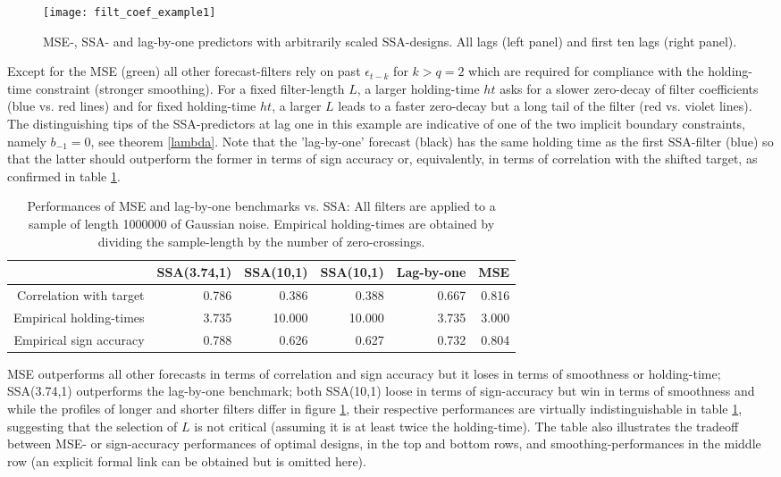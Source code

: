 \documentclass[a4paper]{article}
\begin{document}
\begin{figure}[H]\begin{center}\texttt{[image: filt\_coef\_example1]}\caption{MSE-, SSA- and lag-by-one predictors with arbitrarily scaled SSA-designs. All lags (left panel) and first ten lags (right panel).\label{filt_coef_example1}}\end{center}\end{figure}Except for the MSE (green) all other forecast-filters rely on past $\epsilon_{t-k}$ for $k>q=2$ which are required for compliance with the holding-time constraint (stronger smoothing). For a fixed filter-length $L$, a larger holding-time $ht$ asks for a slower zero-decay of filter coefficients (blue vs. red lines) and for fixed holding-time $ht$, a larger $L$ leads to a faster zero-decay but a long tail of the filter (red vs. violet lines). The distinguishing tips  of the SSA-predictors at lag one in this example are indicative of one of the two implicit boundary constraints, namely $b_{-1}=0$, see theorem \ref{lambda}.  Note that the 'lag-by-one' forecast (black) has the same holding time as the first SSA-filter (blue) so that the latter should outperform the former in terms of sign accuracy or, equivalently, in terms of correlation with the shifted target, as confirmed in table \ref{perf_ex2}.   
\begin{table}[ht]
\centering
\begin{tabular}{rrrrrr}
  \hline
 & SSA(3.74,1) & SSA(10,1) & SSA(10,1) & Lag-by-one & MSE \\ 
  \hline
Correlation with target & 0.786 & 0.386 & 0.388 & 0.667 & 0.816 \\ 
  Empirical holding-times & 3.735 & 10.000 & 10.000 & 3.735 & 3.000 \\ 
  Empirical sign accuracy & 0.788 & 0.626 & 0.627 & 0.732 & 0.804 \\ 
   \hline
\end{tabular}
\caption{Performances of MSE and lag-by-one  benchmarks vs. SSA: All filters are applied to a sample of length 1000000 of Gaussian noise. Empirical holding-times are obtained by dividing the sample-length by the number of zero-crossings.  } 
\label{perf_ex2}
\end{table}MSE outperforms all other forecasts in terms of correlation and sign accuracy  but it loses in terms of  smoothness or holding-time; SSA(3.74,1) outperforms the lag-by-one benchmark; both SSA(10,1) loose in terms of sign-accuracy but win in terms of smoothness and while the profiles of longer and shorter filters differ in figure \ref{filt_coef_example1}, their respective performances are virtually indistinguishable in table \ref{perf_ex2}, suggesting that the selection of $L$ is not critical (assuming it is at least twice the holding-time). The table also illustrates the tradeoff between MSE- or sign-accuracy performances of optimal designs, in the top and bottom rows, and smoothing-performances in the middle row (an explicit formal link can be obtained but is omitted here). 
\end{document}

